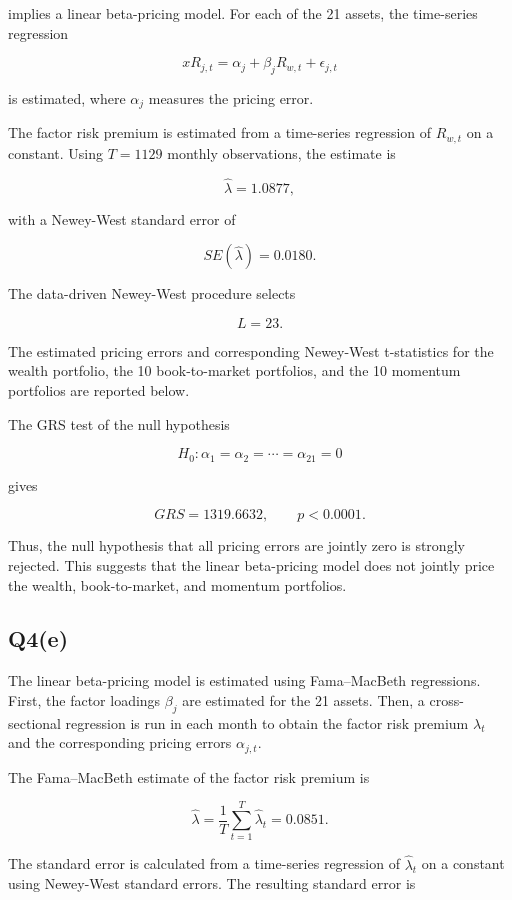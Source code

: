 \documentclass{article}
\begin{document}
implies a linear beta-pricing model. For each of the 21 assets, the time-series regression

\[
xR_{j,t}
=
\alpha_j+\beta_j R_{w,t}+\epsilon_{j,t}
\]

is estimated, where \(\alpha_j\) measures the pricing error.

The factor risk premium is estimated from a time-series regression of \(R_{w,t}\) on a constant. Using \(T=1129\) monthly observations, the estimate is

\[
\hat{\lambda}=1.0877,
\]

with a Newey-West standard error of

\[
SE(\hat{\lambda})=0.0180.
\]

The data-driven Newey-West procedure selects

\[
L=23.
\]

The estimated pricing errors and corresponding Newey-West t-statistics for the wealth portfolio, the 10 book-to-market portfolios, and the 10 momentum portfolios are reported below.



The GRS test of the null hypothesis

\[
H_0:
\alpha_1=\alpha_2=\cdots=\alpha_{21}=0
\]

gives

\[
GRS=1319.6632,
\qquad
p<0.0001.
\]

Thus, the null hypothesis that all pricing errors are jointly zero is strongly rejected. This suggests that the linear beta-pricing model does not jointly price the wealth, book-to-market, and momentum portfolios.


\subsection{Q4(e)}

The linear beta-pricing model is estimated using Fama--MacBeth regressions. First, the factor loadings \(\beta_j\) are estimated for the 21 assets. Then, a cross-sectional regression is run in each month to obtain the factor risk premium \(\lambda_t\) and the corresponding pricing errors \(\alpha_{j,t}\).

The Fama--MacBeth estimate of the factor risk premium is

\[
\hat{\lambda}
=
\frac{1}{T}\sum_{t=1}^{T}\hat{\lambda}_t
=
0.0851.
\]

The standard error is calculated from a time-series regression of \(\hat{\lambda}_t\) on a constant using Newey-West standard errors. The resulting standard error is
\end{document}
